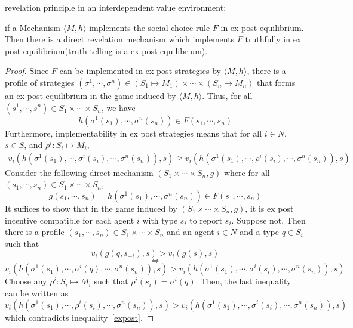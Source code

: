 \begin{prop*}
revelation principle in an interdependent value environment:

if a Mechanism $\langle M, h\rangle$ implements the social choice rule $F$ in ex post 
equilibrium. Then there is a direct revelation mechanism which implements $F$ truthfully in ex post equilibrium(truth telling is a ex
post equilibrium). 

\end{prop*}
\begin{proof}
 Since $F$ can be implemented in ex post strategies by  $\langle M, h\rangle$, there is a profile of strategies $(\sigma^1,\cdots,
 \sigma^n)\in (S_1\mapsto M_1)\times \cdots\times (S_n\mapsto M_n)$ that forms an ex post equilibrium in the game induced by $\langle M, h\rangle$. Thus, for
 all $(s^1, \cdots,s^n)\in S_1\times \cdots\times S_n$, we have
 $$h(\sigma^1(s_1),\cdots,\sigma^n(s_n))\in F(s_1,\cdots,s_n)$$
 Furthermore, implementability in ex post strategies means that for all $i\in N$, $s\in S$, and $\rho^i:S_i\mapsto M_i$,
 \begin{align}\label{expost}
 v_i(h(\sigma^1(s_1),\cdots,\sigma^i(s_i),\cdots,\sigma^n(s_n)),s)\geqslant v_i(h(\sigma^1(s_1),\cdots,\rho^i(s_i),\cdots,\sigma^n(s_n)),s)
 \end{align}
Consider the following direct mechanism $(S_1\times\cdots\times S_n, g)$ where for all $(s_1,\cdots,s_n)\in S_1\times\cdots\times S_n$,
$$g(s_1,\cdots,s_n)=h(\sigma^1(s_1),\cdots,\sigma^n(s_n))\in F(s_1,\cdots,s_n)$$
It suffices to show that in the game induced by $(S_1\times\cdots\times S_n, g)$, it is ex post incentive compatible for each agent 
$i$ with type $s_i$ to report $s_i$. Suppose not. Then there is a profile $(s_1,\cdots,s_n)\in S_1\times\cdots\times S_n$ and an
agent $i\in N$ and a type $q\in S_i$ such that
$$v_i(g(q,s_{-i}),s)>v_i(g(s),s)$$
$$\Longleftrightarrow$$
$$v_i(h(\sigma^1(s_1),\cdots,\sigma^i(q),\cdots,\sigma^n(s_n)),s)>v_i(h(\sigma^1(s_1),\cdots,\sigma^i(s_i),\cdots,\sigma^n(s_n)),s)$$
Choose any $\rho^i:S_i\mapsto M_i$ such that $\rho^i(s_i)=\sigma^i(q)$. Then, the last inequality can be written as
$$v_i(h(\sigma^1(s_1),\cdots,\rho^i(s_i),\cdots,\sigma^n(s_n)),s)>v_i(h(\sigma^1(s_1),\cdots,\sigma^i(s_i),\cdots,\sigma^n(s_n)),s)$$
which contradicts inequality~\ref{expost}.
 \end{proof}